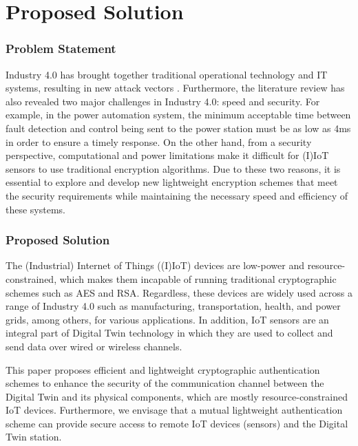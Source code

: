 

\chapter{Proposed Solution}
\label{Chapter5} %

\subsection{Problem Statement}
Industry 4.0 has brought together traditional operational technology and IT systems, resulting in new attack vectors \cite{dietzUnleashingDigitalTwin2020}. Furthermore, the literature review has also revealed two major challenges in Industry 4.0: speed and security. For example, in the power automation system, the minimum acceptable time between fault detection and control being sent to the power station must be as low as 4ms \cite{rajkumar_cyber_2020} in order to ensure a timely response. On the other hand, from a security perspective, computational and power limitations make it difficult for (I)IoT sensors to use traditional encryption algorithms. Due to these two reasons, it is essential to explore and develop new lightweight encryption schemes that meet the security requirements while maintaining the necessary speed and efficiency of these systems.

\subsection{Proposed Solution}
The (Industrial) Internet of Things ((I)IoT) devices are low-power and resource-constrained, which makes them incapable of running traditional cryptographic schemes such as AES and RSA. Regardless, these devices are widely used across a range of Industry 4.0 such as manufacturing, transportation, health, and power grids, among others, for various applications. In addition, IoT sensors are an integral part of Digital Twin technology in which they are used to collect and send data over wired or wireless channels.

This paper proposes efficient and lightweight cryptographic authentication schemes to enhance the security of the communication channel between the Digital Twin and its physical components, which are mostly resource-constrained IoT devices. Furthermore, we envisage that a mutual lightweight authentication scheme can provide secure access to remote IoT devices (sensors) and the Digital Twin station.

